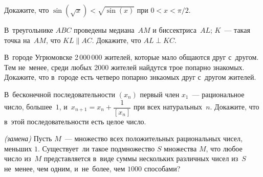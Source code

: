 

\begin{problems}

\item
Докажите, что $\sin(\sqrt{x}) < \sqrt{\sin(x)}$ при $0 < x < \pi / 2$.

\item
В~треугольнике $ABC$ проведены медиана~$AM$ и биссектриса~$AL$;
$K$~--- такая точка на~$AM$, что $KL \parallel AC$.
Докажите, что $AL \perp KC$.

\item
В~городе Угрюмовске 2\,000\,000 жителей, которые мало общаются друг с~другом.
Тем не~менее, среди любых 2000 жителей найдутся трое попарно знакомых.
Докажите, что в~городе есть четверо попарно знкаомых друг с~другом жителей.

\item
В~бесконечной последовательности $(x_n)$ первый член $x_1$~--- рациональное
число, большее~$1$, и~$x_{n+1} = x_n + \dfrac{1}{[x_n]}$ при всех
натуральных~$n$.
Докажите, что в~этой последовательности есть целое число.

 \emph{(замена)}
Пусть $M$~--- множество всех положительных рациональных чисел, меньших $1$.
Существует~ли такое подмножество $S$ множества $M$, что любое число из~$M$
представляется в~виде суммы нескольких различных чисел из~$S$ не~менее, чем
одним, и~не~более, чем $1000$ способами?

\end{problems}


